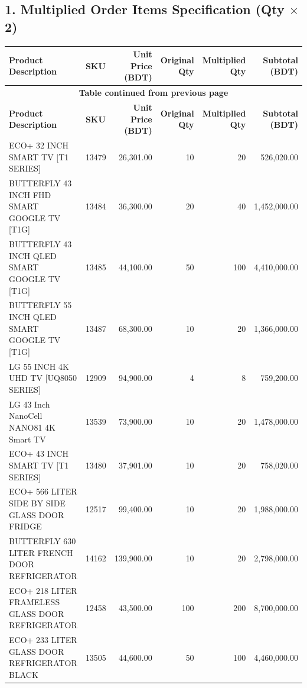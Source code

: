 \documentclass[9pt, a4paper]{article}
\begin{document}
\subsection*{1. Multiplied Order Items Specification (Qty $\times$ 2)}
\fontsize{7.5}{9.5}\selectfont
\begin{longtable}{p{5.5cm} p{1.2cm} r r r r}
    \toprule
    \textbf{Product Description} & \textbf{SKU} & \textbf{Unit Price (BDT)} & \textbf{Original Qty} & \textbf{Multiplied Qty} & \textbf{Subtotal (BDT)} \\
    \midrule
    \endfirsthead
    \multicolumn{6}{c}{{\bfseries \textcolor{corporateblue}{Table continued from previous page}}} \\
    \toprule
    \textbf{Product Description} & \textbf{SKU} & \textbf{Unit Price (BDT)} & \textbf{Original Qty} & \textbf{Multiplied Qty} & \textbf{Subtotal (BDT)} \\
    \midrule
    \endhead
    \bottomrule
    \endfoot
    \bottomrule
    \endlastfoot

    ECO+ 32 INCH SMART TV [T1 SERIES] & 13479 & 26,301.00 & 10 & 20 & 526,020.00 \\
    BUTTERFLY 43 INCH FHD SMART GOOGLE TV [T1G] & 13484 & 36,300.00 & 20 & 40 & 1,452,000.00 \\
    BUTTERFLY 43 INCH QLED SMART GOOGLE TV [T1G] & 13485 & 44,100.00 & 50 & 100 & 4,410,000.00 \\
    BUTTERFLY 55 INCH QLED SMART GOOGLE TV [T1G] & 13487 & 68,300.00 & 10 & 20 & 1,366,000.00 \\
    LG 55 INCH 4K UHD TV [UQ8050 SERIES] & 12909 & 94,900.00 & 4 & 8 & 759,200.00 \\
    LG 43 Inch NanoCell NANO81 4K Smart TV & 13539 & 73,900.00 & 10 & 20 & 1,478,000.00 \\
    ECO+ 43 INCH SMART TV [T1 SERIES] & 13480 & 37,901.00 & 10 & 20 & 758,020.00 \\
    ECO+ 566 LITER SIDE BY SIDE GLASS DOOR FRIDGE & 12517 & 99,400.00 & 10 & 20 & 1,988,000.00 \\
    BUTTERFLY 630 LITER FRENCH DOOR REFRIGERATOR & 14162 & 139,900.00 & 10 & 20 & 2,798,000.00 \\
    ECO+ 218 LITER FRAMELESS GLASS DOOR REFRIGERATOR & 12458 & 43,500.00 & 100 & 200 & 8,700,000.00 \\
    ECO+ 233 LITER GLASS DOOR REFRIGERATOR BLACK & 13505 & 44,600.00 & 50 & 100 & 4,460,000.00 \\
\end{longtable}
\end{document}
